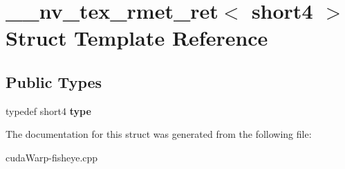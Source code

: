 \hypertarget{struct____nv__tex__rmet__ret_3_01short4_01_4}{}\section{\+\_\+\+\_\+nv\+\_\+tex\+\_\+rmet\+\_\+ret$<$ short4 $>$ Struct Template Reference}
\label{struct____nv__tex__rmet__ret_3_01short4_01_4}
\subsection*{Public Types}
\begin{DoxyCompactItemize}
\item 
typedef short4 {\bfseries type}\hypertarget{struct____nv__tex__rmet__ret_3_01short4_01_4_a6d6f80e668caafab92371976dea734cb}{}\label{struct____nv__tex__rmet__ret_3_01short4_01_4_a6d6f80e668caafab92371976dea734cb}

\end{DoxyCompactItemize}


The documentation for this struct was generated from the following file\+:\begin{DoxyCompactItemize}
\item 
cuda\+Warp-\/fisheye.\+cpp\end{DoxyCompactItemize}
